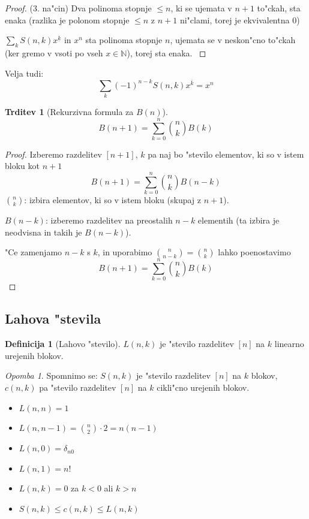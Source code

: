 \documentclass[a4paper,12pt]{article}
\theoremstyle{definition}
\newtheorem{defn}[counter]{Definicija}
\newtheorem{claim}[counter]{Trditev}
\theoremstyle{remark}
\newtheorem*{rem}{Opomba}
\newcommand{\N}{\mathbb{N}}
\begin{document}
\begin{proof}(3. na"cin)
	Dva polinoma stopnje $\leqslant n$, ki se ujemata v $n+1$ to"ckah, sta enaka (razlika je polonom stopnje $\leqslant n$ z $n+1$ ni"clami, torej je ekvivalentna 0)

	$\sum_k S(n,k)x^{\underline{k}}$ in $x^n$ sta polinoma stopnje $n$, ujemata se v neskon"cno to"ckah (ker gremo v vsoti po vseh $x \in \N$), torej sta enaka.
	\label{TODO: zakaj se ujemata?}
\end{proof}

Velja tudi: \[\sum_k (-1)^{n-k} S(n,k) x^{\overline{k}} = x^n\]

\begin{claim}[Rekurzivna formula za $B(n)$]
    \[B(n+1) = \sum_{k=0}^n \binom{n}{k} B(k)\]
\end{claim}

\begin{proof}
    Izberemo razdelitev $[n+1]$, $k$ pa naj bo "stevilo elementov, ki so v istem bloku kot $n+1$
    \[B(n+1) = \sum_{k=0}^n \binom{n}{k}B(n-k)\]
    $\binom{n}{k}$: izbira elementov, ki so v istem bloku (skupaj z $n+1$).
    
    $B(n-k)$: izberemo razdelitev na preostalih $n-k$ elementih (ta izbira je neodvisna in takih je $B(n-k)$).
    
    "Ce zamenjamo $n-k$ s $k$, in uporabimo $\binom{n}{n-k} = \binom{n}{k}$ lahko poenostavimo
    \[B(n+1) = \sum_{k=0}^n \binom{n}{k}B(k)\]
\end{proof}

\subsection{Lahova "stevila}
\begin{defn}[Lahovo "stevilo]
	$L(n,k)$ je "stevilo razdelitev $[n]$ na $k$ linearno urejenih blokov.
\end{defn}
\begin{rem}
	Spomnimo se: $S(n,k)$ je "stevilo razdelitev $[n]$ na $k$ blokov, $c(n,k)$ pa "stevilo razdelitev $[n]$ na $k$ cikli"cno urejenih blokov.
\end{rem}

\begin{itemize}
	\item $L(n,n) = 1$
	\item $L(n,n-1) = \binom{n}{2}\cdot 2 = n(n-1)$
	\item $L(n,0) = \delta_{n0}$
	\item $L(n,1) = n!$
	\item $L(n,k) = 0$ za $k < 0$ ali $k > n$
	\item $S(n,k) \leqslant c(n,k) \leqslant L(n,k)$
\end{itemize}
\end{document}
